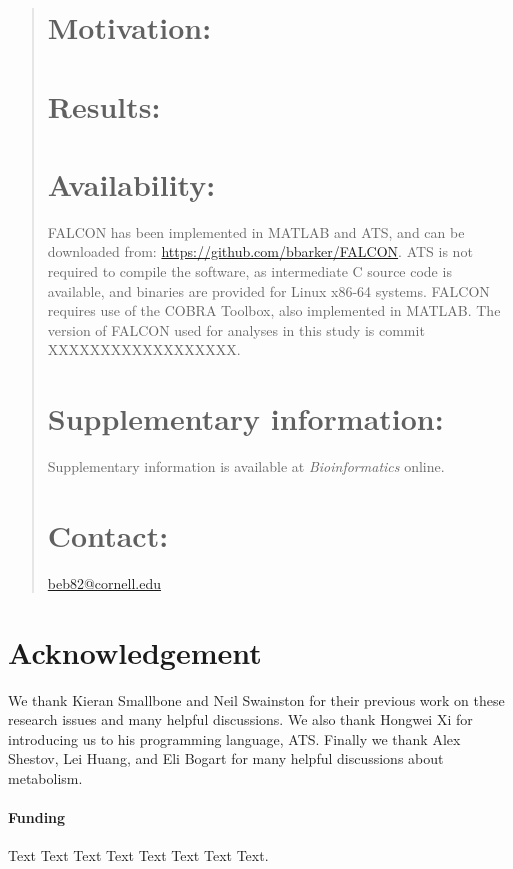 \documentclass{bioinfo}
\begin{document}
\begin{abstract}

\section{Motivation:}
\falconAbstractMotivation

\section{Results:}
\falconAbstractResults

\section{Availability:}
FALCON has been implemented in MATLAB and ATS, and can be downloaded
from: \url{https://github.com/bbarker/FALCON}. ATS is not required to
compile the software, as intermediate C source code is available, and
binaries are provided for Linux x86-64 systems.  FALCON requires use
of the COBRA Toolbox, also implemented in MATLAB. The version of 
FALCON used for analyses in this study is commit XXXXXXXXXXXXXXXXXX.

\section{Supplementary information:}
Supplementary information is available at \emph{Bioinformatics}
online.

\section{Contact:} \href{beb82@cornell.edu}{beb82@cornell.edu}
\end{abstract}



\section*{Acknowledgement}
We thank Kieran Smallbone and Neil Swainston for their previous work
on these research issues and many helpful discussions. We also thank
Hongwei Xi for introducing us to his programming language,
ATS. Finally we thank Alex Shestov, Lei Huang, and Eli Bogart
for many helpful discussions about metabolism.

\paragraph{Funding\textcolon} Text Text Text Text Text Text  Text Text.

%
%
%
%
%
%
%
%
%



\end{document}
